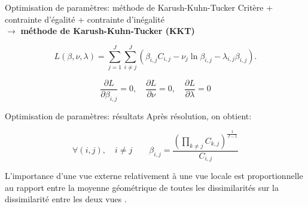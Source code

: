 \documentclass[hyperref={pdfpagelabels=false}]{beamer}
\begin{document}
    \begin{frame}{Optimisation de paramètres: méthode de Karush-Kuhn-Tucker}
        Critère + contrainte d'égalité + contrainte d'inégalité\\
        $\rightarrow$ \textbf{méthode de Karush-Kuhn-Tucker (KKT)} 

        \begin{equation*}
        L(\beta,\nu,\lambda)=\sum_{j=1}^J  \sum_{i \neq j}^J ( \beta_{i,j}  C_{i,j}
        - \nu_j  \ln  \beta_{i,j}  - \lambda_{i,j}   \beta_{i,j} ).
        \end{equation*}

        \begin{equation*}
            \frac{\partial L}{\partial \beta_{i,j}} = 0,
            \quad
            \frac{\partial L}{\partial \nu} = 0,
            \quad
            \frac{\partial L}{\partial \lambda} = 0
        \end{equation*}
    \end{frame}
    
    \begin{frame}{Optimisation de paramètres: résultats}
        Après résolution, on obtient:

        \vspace{0.6cm}

        \begin{equation*}
            \forall (i,j), \quad i\neq j \qquad \beta_{i,j} =  
            \frac{(\prod_{k\neq j} C _{k,j})^{\frac 
            1 {J-1}}}{C_{i,j}}
        \end{equation*} 

        \vspace{1cm}
        L'importance d'une vue externe relativement à une vue locale est
        proportionnelle au rapport entre la moyenne géométrique de toutes les
        dissimilarités sur la dissimilarité entre les deux vues
        .\\
    \end{frame}
\end{document}

